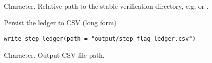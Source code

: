 \documentclass[a4paper]{book}
\begin{document}
%
\begin{Value}
Character. Relative path to the stable verification directory,
e.g.  or
.
\end{Value}
%
\begin{Description}
Persist the ledger to CSV (long form)
\end{Description}
%
\begin{Usage}
\begin{verbatim}
write_step_ledger(path = "output/step_flag_ledger.csv")
\end{verbatim}
\end{Usage}
%
\begin{Arguments}
\begin{ldescription}
\item[\code{path}] Character. Output CSV file path.
\end{ldescription}
\end{Arguments}
\printindex{}
\end{document}
